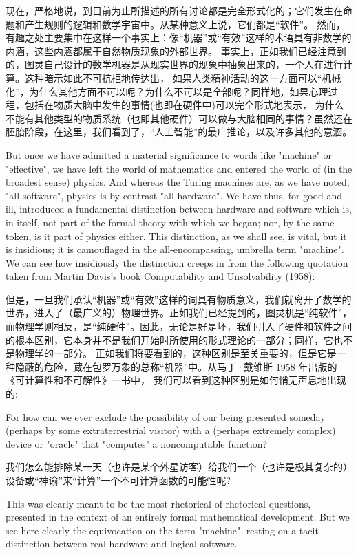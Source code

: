 \documentclass[a4paper,12pt]{article}
\begin{document}
现在，严格地说，到目前为止所描述的所有讨论都是完全形式化的；它们发生在命题和产生规则的逻辑和数学宇宙中。从某种意义上说，它们都是“软件”。
然而，有趣之处主要集中在这样一个事实上：像“机器”或“有效”这样的术语具有非数学的内涵，这些内涵都属于自然物质现象的外部世界。
事实上，正如我们已经注意到的，图灵自己设计的数学机器是从现实世界的现象中抽象出来的，一个人在进行计算。这种暗示如此不可抗拒地传达出，
如果人类精神活动的这一方面可以“机械化”，为什么其他方面不可以呢？为什么不可以是全部呢？同样地，如果心理过程，包括在物质大脑中发生的事情(也即在硬件中)可以完全形式地表示，
为什么不能有其他类型的物质系统（也即其他硬件）可以做与大脑相同的事情？虽然还在胚胎阶段，在这里，我们看到了，“人工智能”的最广推论，以及许多其他的意涵。

But once we have admitted a material significance to words like "machine" or "effective", we have left the world of mathematics and entered
the world of (in the broadest sense) physics. And whereas the Turing machines are, as we have noted, "all software", physics is by contrast "all hardware".
We have thus, for good and ill, introduced a fundamental distinction between hardware and software which is, in itself,
not part of the formal theory with which we began; nor, by the same token, is it part of physics either. This distinction,
as we shall see, is vital, but it is insidious; it is camouflaged in the all-encompassing, umbrella term "machine".  We can
see how insidiously the distinction creeps in from the following quotation taken from Martin Davis's book Computability and Unsolvability (1958):

但是，一旦我们承认“机器”或“有效”这样的词具有物质意义，我们就离开了数学的世界，进入了（最广义的）物理世界。正如我们已经提到的，图灵机是“纯软件”，
而物理学则相反，是“纯硬件”。因此，无论是好是坏，我们引入了硬件和软件之间的根本区别，它本身并不是我们开始时所使用的形式理论的一部分；同样，它也不是物理学的一部分。
正如我们将要看到的，这种区别是至关重要的，但是它是一种隐蔽的危险，藏在包罗万象的总称“机器”中。从马丁·戴维斯 1958 年出版的《可计算性和不可解性》一书中，
我们可以看到这种区别是如何悄无声息地出现的:

For how can we ever exclude the possibility of our being presented someday (perhaps by some extraterrestrial visitor) with
a (perhaps extremely complex) device or "oracle" that "computes" a noncomputable function?

我们怎么能排除某一天（也许是某个外星访客）给我们一个（也许是极其复杂的）设备或“神谕”来“计算”一个不可计算函数的可能性呢?

This was clearly meant to be the most rhetorical of rhetorical questions, presented in the context of an entirely formal mathematical development.
But we see here clearly the equivocation on the term "machine", resting on a tacit distinction between real hardware and logical software.
\end{document}
